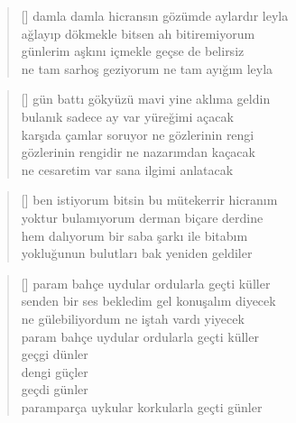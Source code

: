 \documentclass[10pt, openright, twoside]{memoir}
\theoremstyle{definition}
\begin{document}
\vspace*{\fill}
%
\newpage
{}
\vspace*{\fill}
\settowidth{\versewidth}{damla damla hicransın gözümde aylardır leyla}
\begin{verse}[\versewidth]
  damla damla hicransın gözümde aylardır leyla \\
  ağlayıp dökmekle bitsen ah bitiremiyorum \\
  günlerim aşkını içmekle geçse de belirsiz \\
  ne tam sarhoş geziyorum ne tam ayığım leyla
\end{verse}
\vspace*{\fill}
%
\newpage
{}
\vspace*{\fill}
\settowidth{\versewidth}{karşıda çamlar soruyor ne gözlerinin rengi}
\begin{verse}[\versewidth]
  gün battı gökyüzü mavi yine aklıma geldin \\
  bulanık sadece ay var yüreğimi açacak \\
  karşıda çamlar soruyor ne gözlerinin rengi \\
  gözlerinin rengidir ne nazarımdan kaçacak \\
  ne cesaretim var sana ilgimi anlatacak
\end{verse}
\vspace*{\fill}
%
\newpage
{}
\vspace*{\fill}
\settowidth{\versewidth}{ben istiyorum bitsin bu mütekerrir hicranım}
\begin{verse}[\versewidth]
  ben istiyorum bitsin bu mütekerrir hicranım \\
  yoktur bulamıyorum derman biçare derdine \\
  hem dalıyorum bir saba şarkı ile bitabım \\
  yokluğunun bulutları bak yeniden geldiler
\end{verse}
\vspace*{\fill}
%
\newpage
{}
\vspace*{\fill}
\settowidth{\versewidth}{senden bir ses bekledim gel konuşalım diyecek}
\begin{verse}[\versewidth]
  param bahçe uydular ordularla geçti küller \\
  senden bir ses bekledim gel konuşalım diyecek \\
  ne gülebiliyordum ne iştah vardı yiyecek \\
  param bahçe uydular ordularla geçti küller \\
  geçgi dünler \\
  dengi güçler \\
  geçdi günler \\
  paramparça uykular korkularla geçti günler
\end{verse}
\end{document}
